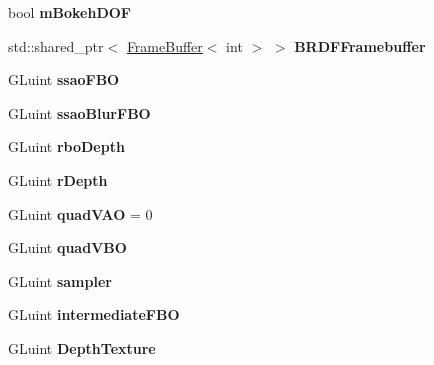 \begin{DoxyCompactItemize}
\item 
bool {\bfseries m\+Bokeh\+D\+OF}\hypertarget{class_post_process_a58a502782040a717398ca8d0dd27c2bb}{}\label{class_post_process_a58a502782040a717398ca8d0dd27c2bb}

\item 
std\+::shared\+\_\+ptr$<$ \hyperlink{class_frame_buffer}{Frame\+Buffer}$<$ int $>$ $>$ {\bfseries B\+R\+D\+F\+Framebuffer}\hypertarget{class_post_process_a1d53ee6e17aabaa2b8b28cf795174292}{}\label{class_post_process_a1d53ee6e17aabaa2b8b28cf795174292}

\item 
G\+Luint {\bfseries ssao\+F\+BO}\hypertarget{class_post_process_a560ec6825b911f05a940ff6e90af6600}{}\label{class_post_process_a560ec6825b911f05a940ff6e90af6600}

\item 
G\+Luint {\bfseries ssao\+Blur\+F\+BO}\hypertarget{class_post_process_aa5a1c421781775cb4a18113b0644d914}{}\label{class_post_process_aa5a1c421781775cb4a18113b0644d914}

\item 
G\+Luint {\bfseries rbo\+Depth}\hypertarget{class_post_process_adfa2993fd0809b22f1e1d27d1dc2f4bf}{}\label{class_post_process_adfa2993fd0809b22f1e1d27d1dc2f4bf}

\item 
G\+Luint {\bfseries r\+Depth}\hypertarget{class_post_process_afd0632053fabcfd93fa93ab8bd757c32}{}\label{class_post_process_afd0632053fabcfd93fa93ab8bd757c32}

\item 
G\+Luint {\bfseries quad\+V\+AO} = 0\hypertarget{class_post_process_ac892657e2c03193ece1345e6047e0c40}{}\label{class_post_process_ac892657e2c03193ece1345e6047e0c40}

\item 
G\+Luint {\bfseries quad\+V\+BO}\hypertarget{class_post_process_a2f57cd2163651048c86218b24d472b3f}{}\label{class_post_process_a2f57cd2163651048c86218b24d472b3f}

\item 
G\+Luint {\bfseries sampler}\hypertarget{class_post_process_a605886eebec0fcc44846b1d9f96eb4bb}{}\label{class_post_process_a605886eebec0fcc44846b1d9f96eb4bb}

\item 
G\+Luint {\bfseries intermediate\+F\+BO}\hypertarget{class_post_process_af7ab6af3c0275eeeeee1629d653f616c}{}\label{class_post_process_af7ab6af3c0275eeeeee1629d653f616c}

\item 
G\+Luint {\bfseries Depth\+Texture}\hypertarget{class_post_process_aaec91922bacb1eaddaf9b25f255457d9}{}\label{class_post_process_aaec91922bacb1eaddaf9b25f255457d9}


\end{DoxyCompactItemize}
